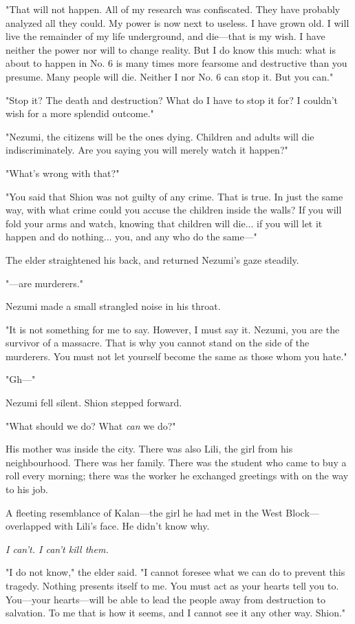 "That will not happen. All of my research was confiscated. They have
probably analyzed all they could. My power is now next to useless. I
have grown old. I will live the remainder of my life underground, and
die---that is my wish. I have neither the power nor will to change
reality. But I do know this much: what is about to happen in No. 6 is
many times more fearsome and destructive than you presume. Many people
will die. Neither I nor No. 6 can stop it. But you can."

"Stop it? The death and destruction? What do I have to stop it for? I
couldn't wish for a more splendid outcome."

"Nezumi, the citizens will be the ones dying. Children and adults will
die indiscriminately. Are you saying you will merely watch it happen?"

"What's wrong with that?"

"You said that Shion was not guilty of any crime. That is true. In just
the same way, with what crime could you accuse the children inside the
walls? If you will fold your arms and watch, knowing that children will
die... if you will let it happen and do nothing... you, and any who do
the same---"

The elder straightened his back, and returned Nezumi's gaze steadily.

"---are murderers."

Nezumi made a small strangled noise in his throat.

"It is not something for me to say. However, I must say it. Nezumi, you
are the survivor of a massacre. That is why you cannot stand on the side
of the murderers. You must not let yourself become the same as those
whom you hate."

"Gh---"

Nezumi fell silent. Shion stepped forward.

"What should we do? What \emph{can} we do?"

His mother was inside the city. There was also Lili, the girl from his
neighbourhood. There was her family. There was the student who came to
buy a roll every morning; there was the worker he exchanged greetings
with on the way to his job.

A fleeting resemblance of Kalan---the girl he had met in the West
Block---overlapped with Lili's face. He didn't know why.

\emph{I can't. I can't kill them.}

"I do not know," the elder said. "I cannot foresee what we can do to
prevent this tragedy. Nothing presents itself to me. You must act as
your hearts tell you to. You---your hearts---will be able to lead the people
away from destruction to salvation. To me that is how it seems, and I
cannot see it any other way. Shion."

